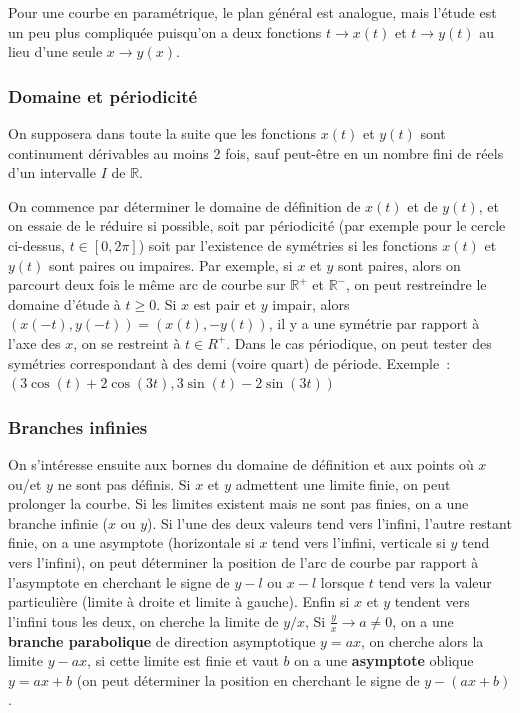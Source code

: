 \documentclass[a4paper,11pt]{article}
\newcommand{\R}{{\mathbb{R}}}
\begin{document}
\begin{giacjshere}
Pour une courbe en param\'etrique, le plan g\'en\'eral est analogue,
mais l'\'etude est un peu plus compliqu\'ee puisqu'on a 
deux fonctions $t \rightarrow x(t)$ et $t \rightarrow y(t)$
au lieu d'une seule $x \rightarrow y(x)$.

\subsubsection{Domaine et p\'eriodicit\'e}
On supposera dans toute la suite que les fonctions $x(t)$ et $y(t)$
sont continument d\'erivables au moins 2 fois, sauf peut-\^etre
en un nombre fini de r\'eels d'un intervalle $I$ de $\R$.

On commence par d\'eterminer le domaine de d\'efinition de $x(t)$
et de $y(t)$, et on essaie de le r\'eduire si possible, soit par
p\'eriodicit\'e (par exemple pour le cercle ci-dessus, $t \in [0,2 \pi]$)
soit par l'existence de sym\'etries si les fonctions
$x(t)$ et $y(t)$ sont paires ou impaires. Par exemple, si $x$ et $y$
sont paires, alors on parcourt deux fois le m\^eme arc de courbe
sur $\R^+$ et $\R^-$, on peut restreindre le domaine d'\'etude
\`a $t\geq 0$. Si $x$ est pair et $y$ impair, alors 
$(x(-t),y(-t))=(x(t),-y(t))$, il y a une sym\'etrie par rapport \`a
l'axe des $x$, on se restreint \`a $t \in R^+$.
Dans le cas p\'eriodique, on peut tester des sym\'etries correspondant
\`a des demi (voire quart) de p\'eriode.
Exemple~: $(3\cos(t)+2\cos(3t),3\sin(t)-2\sin(3t))$ 

\subsubsection{Branches infinies}
On s'int\'eresse ensuite aux bornes du domaine de d\'efinition
et aux points o\`u $x$ ou/et $y$ ne sont pas d\'efinis.
Si $x$ et $y$ admettent une limite finie, on peut prolonger la
courbe. Si les limites existent mais ne sont pas finies, 
on a une branche infinie ($x$ ou $y$). Si l'une des deux
valeurs tend vers l'infini, l'autre restant finie, on a une
asymptote (horizontale si $x$ tend vers l'infini, verticale
si $y$ tend vers l'infini), on peut d\'eterminer la position
de l'arc de courbe par rapport \`a l'asymptote en
cherchant le signe de $y-l$ ou $x-l$ lorsque $t$ tend
vers la valeur particuli\`ere (limite \`a droite et limite
\`a gauche). Enfin si $x$ et $y$ tendent vers l'infini
tous les deux, on cherche la limite de $y/x$,
Si $\frac{y}{x} \rightarrow a \neq 0$, on a une 
{\bf branche parabolique} 
de direction asymptotique $y=ax$,
on cherche alors la limite
$y-ax$, si cette limite est finie et vaut $b$ 
on a une {\bf asymptote} oblique $y=ax+b$ (on peut d\'eterminer
la position en cherchant le signe de $y-(ax+b)$.


\end{giacjshere}
\end{document}
